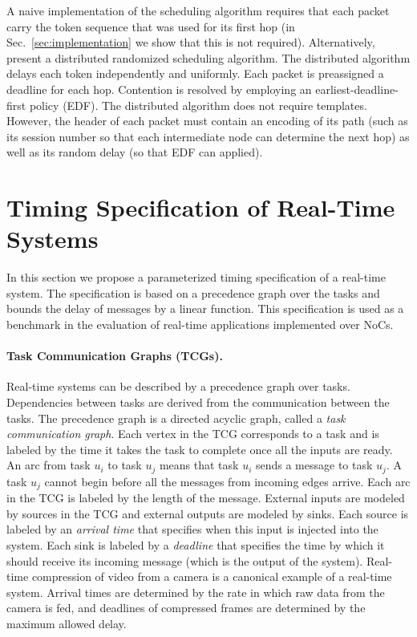 \documentclass[a4paper,12pt]{article}
\newenvironment{proof sketch}[1]{\noindent {\emph{Proof sketch of #1:}}}{\hfill \qed}
\begin{document}
A naive implementation of the scheduling algorithm requires that each packet carry
the token sequence that was used for its first hop (in Sec.~\ref{sec:implementation}
we show that this is not required). Alternatively, ~\cite{andrews2000general} present
a distributed randomized scheduling algorithm. The distributed algorithm delays each
token independently and uniformly. Each packet is preassigned a deadline for each
hop.  Contention is resolved by employing an earliest-deadline-first policy (EDF).
The distributed algorithm does not require templates.  However, the header of each
packet must contain an encoding of its path (such as its session number so that
each intermediate node can determine the next hop) as well as its random delay (so
that EDF can applied).

\section{Timing Specification of Real-Time Systems}\label{sec:spec}
In this section we propose a parameterized timing specification of a real-time
system. The specification is based on a precedence graph over the tasks and bounds
the delay of messages by a linear function. This specification is used as a benchmark
in the evaluation of real-time applications implemented over NoCs.

\paragraph{Task Communication Graphs (TCGs).} Real-time systems can be described by a
precedence graph over tasks.  Dependencies between tasks are derived from the
communication between the tasks.  The precedence graph is a directed acyclic graph,
called a \emph{task communication graph}. Each vertex in the TCG corresponds to
a task and is labeled by the time it takes the task to complete once all the inputs
are ready.  An arc from task $u_i$ to task $u_j$ means that task $u_i$ sends a
message to task $u_j$.  A task $u_j$ cannot begin before all the messages from
incoming edges arrive.  Each arc in the TCG is labeled by the length of the message.
External inputs are modeled by sources in the TCG and external outputs are modeled by
sinks. Each source is labeled by an \emph{arrival time} that specifies when this
input is injected into the system. Each sink is labeled by a \emph{deadline} that
specifies the time by which it should receive its incoming message (which is the
output of the system).  Real-time compression of video from a camera is a canonical
example of a real-time system. Arrival times are determined by the rate in
which raw data from the camera is fed, and deadlines of compressed frames are
determined by the maximum allowed delay. 
\end{document}
